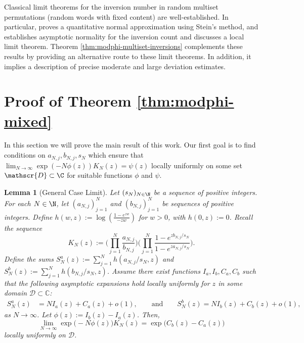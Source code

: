 \documentclass[11pt,a4paper]{scrartcl}
\numberwithin{equation}{section}
\theoremstyle{plain}
\newtheorem{lemma}{Lemma}[section]
\theoremstyle{definition}
\theoremstyle{remark}
\begin{document}
Classical limit theorems for the inversion number in random multiset permutations (random words with fixed content) are well-established. In particular, \cite{CongerViswanath2007} proves a quantitative normal approximation using Stein's method, and \cite{CanfieldJansonZeilberger2011} establishes asymptotic normality for the inversion count and discusses a local limit theorem. Theorem \ref{thm:modphi-multiset-inversions} complements these results by providing an alternative route to these limit theorems. In addition, it implies a  description of precise moderate and large deviation estimates.


\section{Proof of Theorem \ref{thm:modphi-mixed}}\label{sec: proofs}

In this section we will prove the main result of this work. Our first goal is to find  conditions on $a_{N,j}, b_{N,j}, s_N$ which ensure that $\lim_{N\to\infty} \exp(-N \phi(z)) K_N(z) = \psi(z)$ locally uniformly on some set $\mathscr{D} \subset \C$ for suitable functions $\phi$ and $\psi$.	


\begin{lemma}[General Case Limit]\label{lem: general asymptotic framework}
Let $(s_N)_{N\in\N}$ be a sequence of positive integers. For each $N\in\N$, let $(a_{N,j})_{j=1}^N$ and $(b_{N,j})_{j=1}^N$ be sequences of positive integers. Define $h(w, z) := \log(\frac{1-e^{zw}}{-zw})$ for $w>0$, with $h(0, z) := 0$.
Recall the sequence
\[
K_N(z) := \Big( \prod_{j=1}^N \frac{a_{N,j}}{b_{N,j}} \Big) \Big(\prod_{j=1}^N \frac{1-e^{z b_{N,j}/s_N}}{1-e^{z a_{N,j}/s_N}}\Big).
\]
Define the sums $S_N^a(z) := \sum_{j=1}^N h(a_{N,j}/s_N, z)$ and $S_N^b(z) := \sum_{j=1}^N h(b_{N,j}/s_N, z)$. Assume there exist functions $I_a, I_b, C_a, C_b$ such that the following asymptotic expansions hold locally uniformly for $z$ in some domain $\mathscr{D} \subset \mathbb{C}$:
\begin{align*}
	S_N^a(z) &= N I_a(z) + C_a(z) + o(1),\qquad\text{and}\qquad S_N^b(z) = N I_b(z) + C_b(z) + o(1),
\end{align*}
as $N\to\infty$. Let $\phi(z) := I_b(z) - I_a(z)$. Then,
\begin{equation}\label{eq:21-10-25a}
	\lim_{N\to\infty} \exp\big(-N \phi(z) \big) K_N(z) = \exp\big( C_b(z) - C_a(z) \big)
\end{equation}
locally uniformly on $\mathscr{D}$.
\end{lemma}
\end{document}
